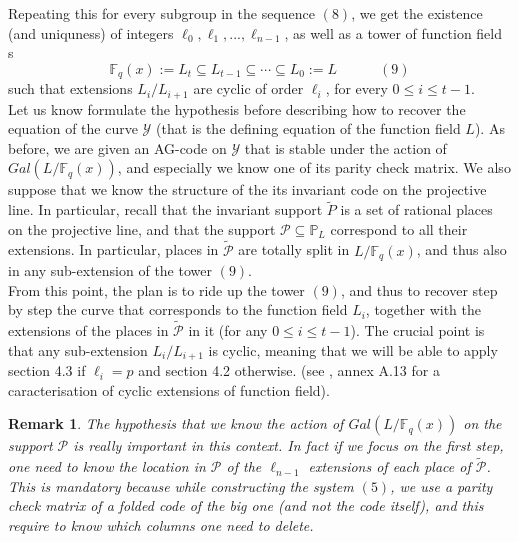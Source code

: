 \documentclass[10pt]{article}
\newtheorem{rq1}{Remark}[]
\newcommand{\s}{\vspace{0.3cm}}
\newcommand{\fq}{\mathbb{F}_q}
\newcommand{\su}{\subseteq}
\newcommand{\Y}{\mathcal{Y}}
\newcommand{\PR}{\mathcal{P}}
\begin{document}
\s

Repeating this for every subgroup in the sequence $(8)$, we get the existence (and uniquness) of integers $\ell_0,\ell_1,...,\ell_{n-1}$, as well as a tower of function field s
\[\fq(x) := L_t \su L_{t-1} \su \cdots \su L_0 := L \quad \quad \quad (9)\]
such that extensions $L_i/L_{i+1}$ are cyclic of order $\ell_i$, for every $0 \leq i \leq t-1$. \\

Let us know formulate the hypothesis before describing how to recover the equation of the curve $\Y$ (that is the defining equation of the function field $L$). As before, we are given an AG-code on $\Y$ that is stable under the action of $Gal(L/\fq(x))$, and especially we know one of its parity check matrix. We also suppose that we know the structure of the its invariant code on the projective line. In particular, recall that the invariant support $\tilde{P}$ is a set of rational places on the projective line, and that the support $\PR \su \mathbb{P}_L$ correspond to all their extensions. In particular, places in $\tilde{\PR}$ are  totally split in $L/\fq(x)$, and thus also in any sub-extension of the tower $(9)$. \\

From this point, the plan is to ride up the tower $(9)$, and thus to recover step by step the curve that corresponds to the function field $L_i$, together with the extensions of the places in $\tilde{\PR}$ in it (for any $0\leq i \leq t-1$). The crucial point is that any sub-extension $L_i/L_{i+1}$ is cyclic, meaning that we will be able to apply section 4.3 if $\ell_i = p$ and section 4.2 otherwise. (see \cite{Sti}, annex A.13 for a caracterisation of cyclic extensions of function field).

\s

\begin{rq1} \rm
The hypothesis that we know the action of $Gal(L/\fq(x))$ on the support $\PR$ is really important in this context. In fact if we focus on the first step, one need to know the location in $\PR$ of the $\ell_{n-1}$ extensions of each place of $\tilde{\PR}$. This is mandatory because while constructing the system $(5)$, we  use a parity check matrix of a folded code of the big one (and not the code itself), and this require to know which columns one need to delete. 
\end{rq1}

\s
\end{document}
